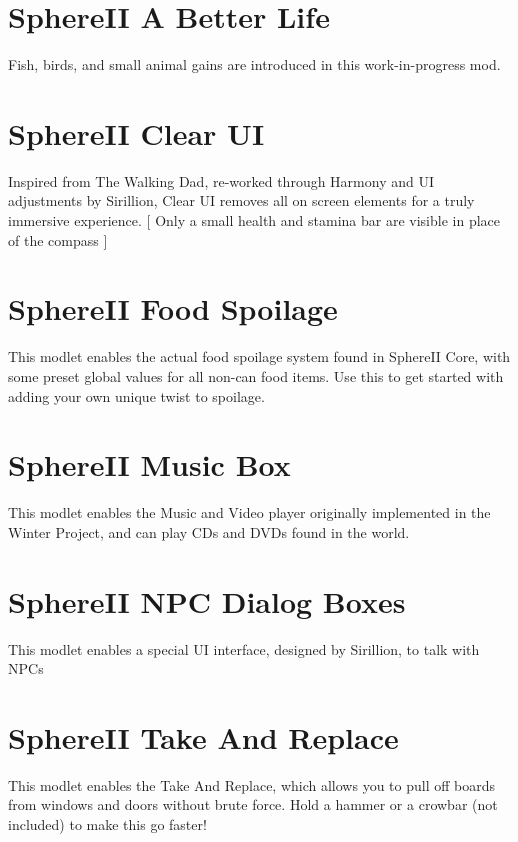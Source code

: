  \hypertarget{index_autotoc_md18}{}\section{Sphere\+I\+I A Better Life}\label{index_autotoc_md18}
Fish, birds, and small animal gains are introduced in this work-\/in-\/progress mod.



 \hypertarget{index_autotoc_md20}{}\section{Sphere\+I\+I Clear UI}\label{index_autotoc_md20}
Inspired from The Walking Dad, re-\/worked through Harmony and UI adjustments by Sirillion, Clear UI removes all on screen elements for a truly immersive experience. \mbox{[} Only a small health and stamina bar are visible in place of the compass \mbox{]}



 \hypertarget{index_autotoc_md22}{}\section{Sphere\+I\+I Food Spoilage}\label{index_autotoc_md22}
This modlet enables the actual food spoilage system found in Sphere\+II Core, with some preset global values for all non-\/can food items. Use this to get started with adding your own unique twist to spoilage.



 \hypertarget{index_autotoc_md24}{}\section{Sphere\+I\+I Music Box}\label{index_autotoc_md24}
This modlet enables the Music and Video player originally implemented in the Winter Project, and can play C\+Ds and D\+V\+Ds found in the world.



 \hypertarget{index_autotoc_md26}{}\section{Sphere\+I\+I N\+P\+C Dialog Boxes}\label{index_autotoc_md26}
This modlet enables a special UI interface, designed by Sirillion, to talk with N\+P\+Cs



 \hypertarget{index_autotoc_md28}{}\section{Sphere\+I\+I Take And Replace}\label{index_autotoc_md28}
This modlet enables the Take And Replace, which allows you to pull off boards from windows and doors without brute force. Hold a hammer or a crowbar (not included) to make this go faster!



